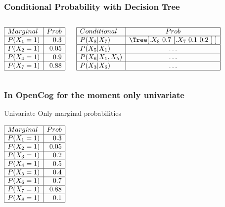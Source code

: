 \documentclass{beamer}
\begin{document}
\frame
{
  
  \frametitle{Conditional Probability with \alert{Decision Tree}}

  \begin{columns}

    \column{1in}

  $
  \begin{array}{|l|r|}
    \hline
    Marginal & Prob\\
    \hline
    P(X_1=1) & 0.3\\
    \hline
    P(X_2=1) & 0.05\\
    \hline
    P(X_4=1) & 0.9\\
    \hline
    P(X_7=1) & 0.88\\
    \hline
  \end{array}
  $

  \column{2in}
  
  $
  \begin{array}{|l|c|}
    \hline
    Conditional & Prob\\
    \hline
    P(X_8|X_7) &
    \text{\Tree [.$X_8$ $0.7$ [.$X_7$ $0.1$ $0.2$ ] ]} \\
    \hline
    P(X_5|X_1) & \ldots \\
    \hline
    P(X_6|X_1,X_5) & \ldots\\
    \hline
    P(X_3|X_6) & \ldots\\
    \hline
  \end{array}
  $

  \end{columns}

}

\frame
{  
  \frametitle{In OpenCog for the moment only \alert{univariate}}

  \begin{beamerboxesrounded}{Univariate}
    Only marginal probabilities
  \end{beamerboxesrounded}
  \begin{center}
  $
  \begin{array}{|l|r|}
    \hline
    Marginal & Prob\\
    \hline
    P(X_1=1) & 0.3\\
    \hline
    P(X_2=1) & 0.05\\
    \hline
    P(X_3=1) & 0.2\\
    \hline
    P(X_4=1) & 0.5\\
    \hline
    P(X_5=1) & 0.4\\
    \hline
    P(X_6=1) & 0.7\\
    \hline
    P(X_7=1) & 0.88\\
    \hline
    P(X_8=1) & 0.1\\
    \hline
  \end{array}
  $
  \end{center}

}
\end{document}
